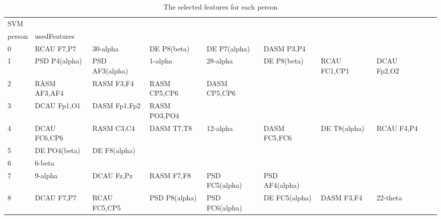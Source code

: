 \begin{landscape}
\begin{table}[]
\centering
\caption{The selected features for each person}
\begin{tabular}{l|llllllll}
SVM      &                &                &                &                &                &                &                &                &               &              \\
person   & usedFeatures   &                &                &                &                &                &                &                &               &              \\
0        & RCAU F7,P7     & 30-alpha       & DE P8(beta)    & DE P7(alpha)   & DASM P3,P4     &                &                &                &               &              \\
1        & PSD P4(alpha)  & PSD AF3(alpha) & 1-alpha        & 28-alpha       & DE P8(beta)    & RCAU FC1,CP1   & DCAU Fp2,O2    &                &               &              \\
2        & RASM AF3,AF4   & RASM F3,F4     & RASM CP5,CP6   & DASM CP5,CP6   &                &                &                &                &               &              \\
3        & DCAU Fp1,O1    & DASM Fp1,Fp2   & RASM PO3,PO4   &                &                &                &                &                &               &              \\
4        & DCAU FC6,CP6   & RASM C3,C4     & DASM T7,T8     & 12-alpha       & DASM FC5,FC6   & DE T8(alpha)   & RCAU F4,P4     &                &               &              \\
5        & DE PO4(beta)   & DE F8(alpha)   &                &                &                &                &                &                &               &              \\
6        & 6-beta         &                &                &                &                &                &                &                &               &              \\
7        & 9-alpha        & DCAU Fz,Pz     & RASM F7,F8     & PSD FC5(alpha) & PSD AF4(alpha) &                &                &                &               &              \\
8        & DCAU F7,P7     & RCAU FC5,CP5   & PSD P8(alpha)  & PSD FC6(alpha) & DE FC5(alpha)  & DASM F3,F4     & 22-theta       &                &               &              \\

\end{tabular}
\end{table}
\end{landscape}
